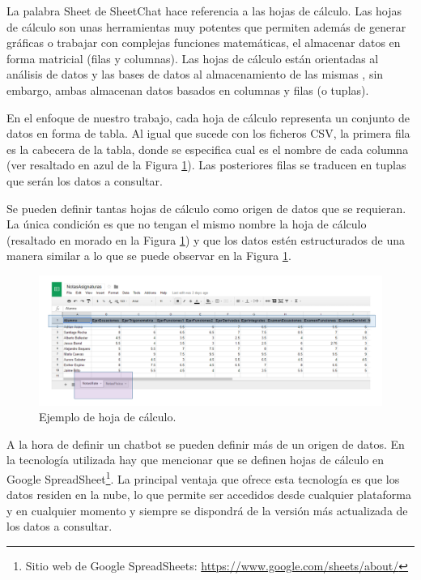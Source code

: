 La palabra Sheet de SheetChat hace referencia a las hojas de cálculo. Las hojas de cálculo son unas herramientas muy potentes que permiten además de generar gráficas o trabajar con complejas funciones matemáticas, el almacenar datos en forma matricial (filas y columnas). Las hojas de cálculo están orientadas al análisis de datos y las bases de datos al almacenamiento de las mismas \cite{Philips2014}, sin embargo, ambas almacenan datos basados en columnas y filas (o tuplas).

En el enfoque de nuestro trabajo, cada hoja de cálculo representa un conjunto de datos en forma de tabla. Al igual que sucede con los ficheros CSV, la primera fila es la cabecera de la tabla, donde se especifica cual es el nombre de cada columna (ver resaltado en azul de la Figura \ref{fig:SheetExample}). Las posteriores filas se traducen en tuplas que serán los datos a consultar.

Se pueden definir tantas hojas de cálculo como origen de datos que se requieran. La única condición es que no tengan el mismo nombre la hoja de cálculo (resaltado en morado en la Figura \ref{fig:SheetExample}) y que los datos estén estructurados de una manera similar a lo que se puede observar en la Figura \ref{fig:SheetExample}.

\begin{figure}[htb]
	\centering
	\includegraphics[width=1.1\textwidth]{./figs/SheetExample.png}
	\caption{Ejemplo de hoja de cálculo.}
	\label{fig:SheetExample}
\end{figure}

A la hora de definir un chatbot se pueden definir más de un origen de datos. En la tecnología utilizada hay que mencionar que se definen hojas de cálculo en Google SpreadSheet\footnote{Sitio web de Google SpreadSheets: \url{https://www.google.com/sheets/about/}}. La principal ventaja que ofrece esta tecnología es que los datos residen en la nube, lo que permite ser accedidos desde cualquier plataforma y en cualquier momento y siempre se dispondrá de la versión más actualizada de los datos a consultar.

